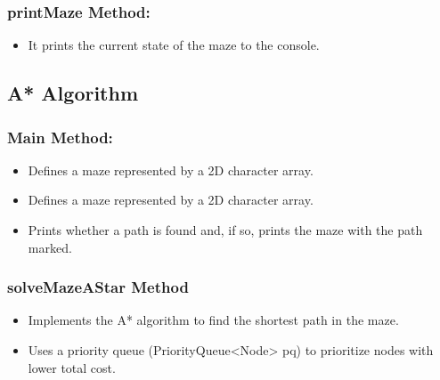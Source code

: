 \documentclass[12pt]{report}
\begin{document}
\subsubsection{printMaze Method:}

\begin{itemize}
    \item It prints the current state of the maze to the console.
\end{itemize}







\subsection{A* Algorithm}
\subsubsection{Main Method:}

\begin{itemize}
    \item Defines a maze represented by a 2D character array.
\end{itemize}

\begin{itemize}
    \item Defines a maze represented by a 2D character array.
\end{itemize}

\begin{itemize}
    \item Prints whether a path is found and, if so, prints the maze with the path marked.
\end{itemize}



\subsubsection{solveMazeAStar Method}

\begin{itemize}
    \item Implements the A* algorithm to find the shortest path in the maze.
\end{itemize}

\begin{itemize}
    \item Uses a priority queue (PriorityQueue<Node> pq) to prioritize nodes with lower total cost.
\end{itemize}
\end{document}

